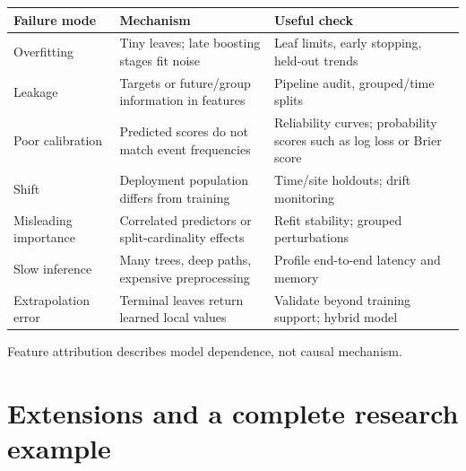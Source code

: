 \begin{center}\small
\begin{tabularx}{\linewidth}{@{}L{.27\linewidth}YY@{}}\toprule
Failure mode & Mechanism & Useful check\\\midrule
Overfitting & Tiny leaves; late boosting stages fit noise & Leaf limits, early stopping, held-out trends\\
Leakage & Targets or future/group information in features & Pipeline audit, grouped/time splits\\
Poor calibration & Predicted scores do not match event frequencies & Reliability curves; probability scores such as log loss or Brier score\\
Shift & Deployment population differs from training & Time/site holdouts; drift monitoring\\
Misleading importance & Correlated predictors or split-cardinality effects & Refit stability; grouped perturbations\\
Slow inference & Many trees, deep paths, expensive preprocessing & Profile end-to-end latency and memory\\
Extrapolation error & Terminal leaves return learned local values & Validate beyond training support; hybrid model\\\bottomrule
\end{tabularx}
\end{center}

\begin{calloutmemoryhook}
Feature attribution describes model dependence, not causal mechanism.
\end{calloutmemoryhook}

\section{Extensions and a complete research example}
\label{sec:trees-extensions-and-a-complete-research-example}
